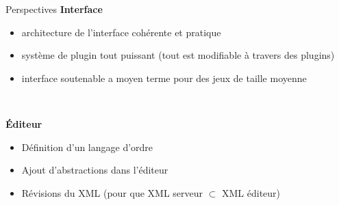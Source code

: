 \documentclass[11pt]{beamer}
\begin{document}
\begin{frame}{Perspectives}
	\textbf{Interface}
	\begin{itemize}
		\item architecture de l'interface cohérente et pratique
		\item système de plugin tout puissant (tout est modifiable à travers des plugins)
		\item interface soutenable a moyen terme pour des jeux de taille moyenne
	\end{itemize}
	
	~
	
	\textbf{Éditeur}
	\begin{itemize}
		\item Définition d'un langage d'ordre
		\item Ajout d'abstractions dans l'éditeur
		\item Révisions du XML (pour que XML serveur $\subset$ XML éditeur)
	\end{itemize}
\end{frame}
\end{document}
